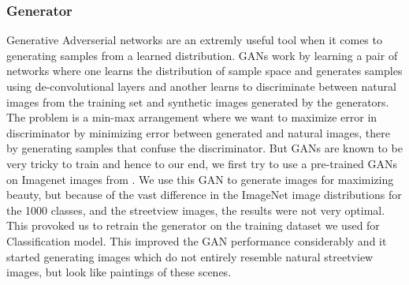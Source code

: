 \subsubsection{Generator}
Generative Adverserial networks are an extremly useful tool when it comes to generating samples from a learned distribution\cite{radford2015unsupervised}. GANs work by learning a pair of networks where one learns the distribution of sample space and generates samples using de-convolutional layers and another learns to discriminate between natural images from the training set and synthetic images generated by the generators. The problem is a min-max arrangement where we want to maximize error in discriminator by minimizing error between generated and natural images, there by generating samples that confuse the discriminator. But GANs are known to be very tricky to train \cite{gulrajani2017improved} and hence to our end, we first try to use a pre-trained GANs on Imagenet images from \cite{nguyen2016synthesizing}. We use this GAN to generate images for maximizing beauty, but because of the vast difference in the ImageNet image distributions for the 1000 classes, and the streetview images, the results were not very optimal. This provoked us to retrain the generator on the training dataset we used for Classification model. This improved the GAN performance considerably and it started generating images which do not entirely resemble natural streetview images, but look like paintings of these scenes. 

